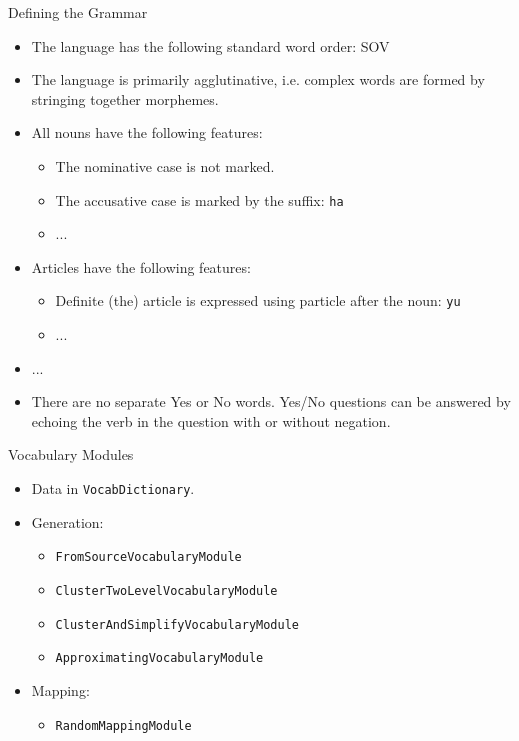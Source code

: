 \documentclass{beamer}
\begin{document}
\begin{frame}{Defining the Grammar}
\begin{itemize}
	\item The language has the following standard word order: SOV
	\item The language is primarily agglutinative, i.e. complex words are formed by stringing together morphemes.
	\item All nouns have the following features:
	\begin{itemize}
		\item The nominative case is not marked.
		\item The accusative case is marked by the suffix: \texttt{ha}
		\item ...
	\end{itemize}
	\item Articles have the following features:
	\begin{itemize}
		\item Definite (the) article is expressed using particle after the noun: \texttt{yu}
		\item ...
	\end{itemize}
	\item ...
	\item There are no separate Yes or No words. Yes/No questions can be answered by echoing the verb in the question with or without negation.
\end{itemize}

\end{frame}

\begin{frame}{Vocabulary Modules}
	\begin{itemize}
		\item Data in \texttt{VocabDictionary}.
		\item Generation:
		\begin{itemize}
			\item \texttt{FromSourceVocabularyModule}
			\item \texttt{ClusterTwoLevelVocabularyModule}
			\item \texttt{ClusterAndSimplifyVocabularyModule}
			\item \texttt{ApproximatingVocabularyModule}
		\end{itemize}
		\item Mapping:
		\begin{itemize}
			\item \texttt{RandomMappingModule}
		\end{itemize}
	\end{itemize}
\end{frame}
\end{document}
